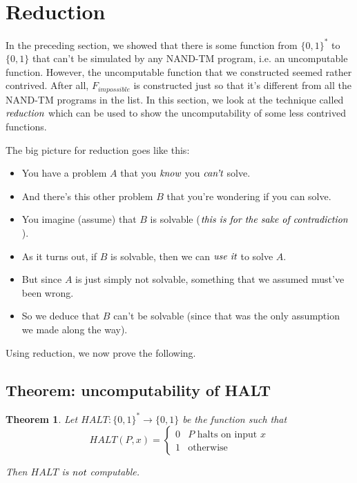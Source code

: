 \documentclass[11pt]{article}
\newtheorem{theorem}{Theorem}
\theoremstyle{definition}
\theoremstyle{remark}
\begin{document}
\section{Reduction}
In the preceding section, we showed that there is some function from $\{0, 1\}^*$ to $\{0, 1\}$ that can't be simulated by
any NAND-TM program, i.e. an uncomputable function. However, the uncomputable function that we constructed seemed rather contrived.
After all, $F_{impossible}$ is constructed just so that it's different from all the NAND-TM programs in the list. In this section,
we look at the technique called $\emph{reduction}$ which can be used to show the uncomputability of some less contrived functions.

The big picture for reduction goes like this:
\begin{itemize}
    \item{
            You have a problem $A$ that you $\emph{know}$ you $\emph{can't}$ solve.
        }
    \item{
        And there's this other problem $B$ that you're wondering if you can solve.
        }
    \item{
            You imagine (assume) that $B$ is solvable ($\emph{this is for the sake of contradiction}$).
        }
    \item{
        As it turns out, if $B$ is solvable, then we can $\emph{use it}$ to solve $A$.
        }
    \item{
        But since $A$ is just simply not solvable, something that we assumed must've been wrong.
        }
    \item{
        So we deduce that $B$ can't be solvable (since that was the only assumption we made along the way).
        }
\end{itemize}

Using reduction, we now prove the following.

\subsection{Theorem: uncomputability of HALT}

\begin{theorem}
    Let $HALT: \{0, 1\}^* \rightarrow \{0, 1\}$ be the function such that
    \begin{equation*}
        HALT(P, x) = \begin{cases}
            0 & \text{$P$ halts on input $x$} \\
            1 & \text{otherwise}
        \end{cases}
    \end{equation*}

    Then $HALT$ is $\emph{not}$ computable.
\end{theorem}
\end{document}
